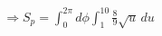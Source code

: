 \documentclass[preview]{standalone}
\begin{document}
\begin{align*}
\Rightarrow S_p = \int_0^{2\pi} d\phi \int_1^{10} \frac{8}{9} \sqrt{u} \, du
\end{align*}
\end{document}

